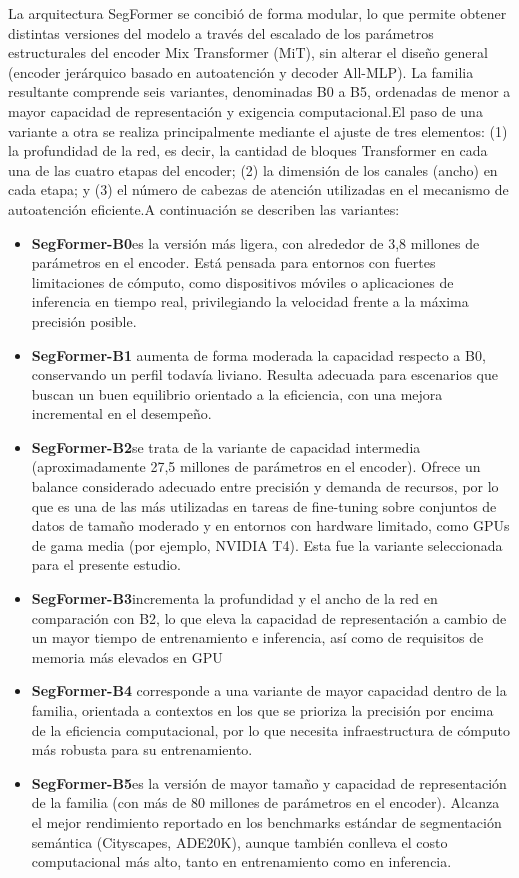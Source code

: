 La arquitectura SegFormer se concibió de forma modular, lo que permite obtener distintas versiones del modelo a través del escalado de los parámetros estructurales del encoder Mix Transformer (MiT), sin alterar el diseño general (encoder jerárquico basado en autoatención y decoder All-MLP). La familia resultante comprende seis variantes, denominadas B0 a B5, ordenadas de menor a mayor capacidad de representación y exigencia computacional.El paso de una variante a otra se realiza principalmente mediante el ajuste de tres elementos: (1) la profundidad de la red, es decir, la cantidad de bloques Transformer en cada una de las cuatro etapas del encoder; (2) la dimensión de los canales (ancho) en cada etapa; y (3) el número de cabezas de atención utilizadas en el mecanismo de autoatención eficiente.A continuación se describen las variantes:
\begin{itemize}
	\item \textbf{SegFormer-B0}es la versión más ligera, con alrededor de 3,8 millones de parámetros en el encoder. Está pensada para entornos con fuertes limitaciones de cómputo, como dispositivos móviles o aplicaciones de inferencia en tiempo real, privilegiando la velocidad frente a la máxima precisión posible.
	\item \textbf{SegFormer-B1}	aumenta de forma moderada la capacidad respecto a B0, conservando un perfil todavía liviano. Resulta adecuada para escenarios que buscan un buen equilibrio orientado a la eficiencia, con una mejora incremental en el desempeño.
	\item \textbf{SegFormer-B2}se trata de la variante de capacidad intermedia (aproximadamente 27,5 millones de parámetros en el encoder). Ofrece un balance considerado adecuado entre precisión y demanda de recursos, por lo que es una de las más utilizadas en tareas de fine-tuning sobre conjuntos de datos de tamaño moderado y en entornos con hardware limitado, como GPUs de gama media (por ejemplo, NVIDIA T4). Esta fue la variante seleccionada para el presente estudio.
	\item \textbf{SegFormer-B3}incrementa la profundidad y el ancho de la red en comparación con B2, lo que eleva la capacidad de representación a cambio de un mayor tiempo de entrenamiento e inferencia, así como de requisitos de memoria más elevados en GPU
	\item \textbf{SegFormer-B4} corresponde a una variante de mayor capacidad dentro de la familia, orientada a contextos en los que se prioriza la precisión por encima de la eficiencia computacional, por lo que necesita infraestructura de cómputo más robusta para su entrenamiento.
	\item \textbf{SegFormer-B5}es la versión de mayor tamaño y capacidad de representación de la familia (con más de 80 millones de parámetros en el encoder). Alcanza el mejor rendimiento reportado en los benchmarks estándar de segmentación semántica (Cityscapes, ADE20K), aunque también conlleva el costo computacional más alto, tanto en entrenamiento como en inferencia.
\end{itemize}

